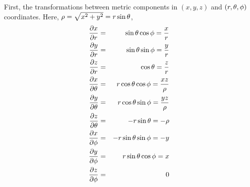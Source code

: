 \documentclass{article}
\begin{document}
First, the transformations between metric components in $(x,y,z)$ and $(r,\theta,\phi)$ coordinates. Here, $\rho=\sqrt{x^2+y^2}=r\sin\theta$,
\begin{eqnarray*}
  \frac{\partial x}{\partial r}
  &=&
  \sin\theta\cos\phi 
  =
  \frac{x}{r}
\\
  \frac{\partial y}{\partial r}
  &=&
  \sin\theta\sin\phi 
  =
  \frac{y}{r}
\\
  \frac{\partial z}{\partial r}
  &=&
  \cos\theta 
  =
  \frac{z}{r}
\\
  \frac{\partial x}{\partial \theta}
  &=&
  r\cos\theta\cos\phi 
  =
  \frac{xz}{\rho}
\\
  \frac{\partial y}{\partial \theta}
  &=&
  r\cos\theta\sin\phi 
  =
  \frac{yz}{\rho}
\\
  \frac{\partial z}{\partial \theta}
  &=&
  -r\sin\theta 
  =
  -\rho
\\
  \frac{\partial x}{\partial \phi}
  &=&
  -r\sin\theta\sin\phi
  =
  -y
\\
  \frac{\partial y}{\partial \phi}
  &=&
  r\sin\theta\cos\phi 
  =
  x
\\
  \frac{\partial z}{\partial \phi}
  &=&
  0
\end{eqnarray*}
\end{document}

